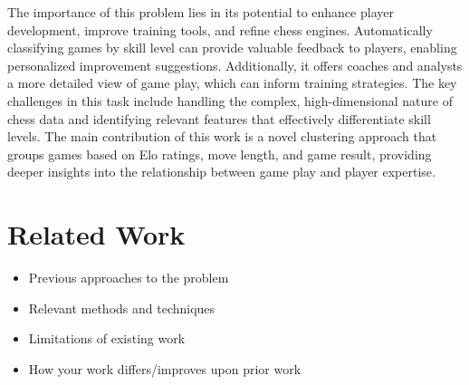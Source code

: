 \documentclass[conference]{IEEEtran}
\begin{document}
The importance of this problem lies in its potential to enhance player development, improve training tools, and refine chess engines. Automatically classifying games by skill level can provide valuable feedback to players, enabling personalized improvement suggestions. Additionally, it offers coaches and analysts a more detailed view of game play, which can inform training strategies. The key challenges in this task include handling the complex, high-dimensional nature of chess data and identifying relevant features that effectively differentiate skill levels. The main contribution of this work is a novel clustering approach that groups games based on Elo ratings, move length, and game result, providing deeper insights into the relationship between game play and player expertise.

\section{Related Work}
\begin{itemize}
\item Previous approaches to the problem
\item Relevant methods and techniques
\item Limitations of existing work
\item How your work differs/improves upon prior work
\end{itemize}
\end{document}

